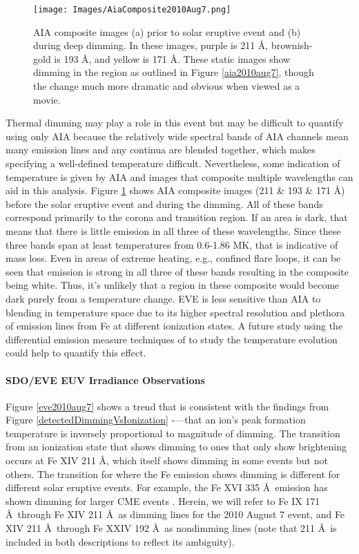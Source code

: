 \begin{figure}[!h]
    \begin{center}
	    \texttt{[image: Images/AiaComposite2010Aug7.png]}
    \end{center}
    \caption[AIA before/after images of 2010 August 7 event]{
	    AIA composite images (a) prior to solar eruptive event and (b) during deep dimming. In these images, purple is 
	    211 \AA, brownish-gold is 193 \AA, and yellow is 171 \AA. These static images show dimming in the region as outlined 
	    in Figure \ref{aia2010aug7}, though the change much more dramatic and obvious when viewed as a movie. 
	}
    \label{aiacomposite2010aug7}
\end{figure}

Thermal dimming may play a role in this event but may be difficult to quantify using only AIA because the relatively wide spectral bands of AIA channels mean many emission lines and any continua are blended together, which makes specifying a well-defined temperature difficult. Nevertheless, some indication of temperature is given by AIA and images that composite multiple wavelengths can aid in this analysis. Figure \ref{aiacomposite2010aug7} shows AIA composite images (211 \& 193 \& 171 \AA) before the solar eruptive event and during the dimming. All of these bands correspond primarily to the corona and transition region. If an area is dark, that means that there is little emission in all three of these wavelengths. Since these three bands span at least temperatures from 0.6-1.86 MK, that is indicative of mass loss. Even in areas of extreme heating, e.g., confined flare loops, it can be seen that emission is strong in all three of these bands resulting in the composite being white. Thus, it's unlikely that a region in these composite would become dark purely from a temperature change. EVE is less sensitive than AIA to blending in temperature space due to its higher spectral resolution and plethora of emission lines from Fe at different ionization states. A future study using the differential emission measure techniques of \citet{Caspi2014} to study the temperature evolution could help to quantify this effect.

\paragraph{SDO/EVE EUV Irradiance Observations}
Figure \ref{eve2010aug7} shows a trend that is consistent with the findings from Figure \ref{detectedDimmingVsIonization} -—that an ion’s peak formation temperature is inversely proportional to magnitude of dimming. The transition from an ionization state that shows dimming to ones that only show brightening occurs at Fe XIV 211 \AA, which itself shows dimming in some events but not others. The transition for where the Fe emission shows dimming is different for different solar eruptive events. For example, the Fe XVI 335 \AA\ emission has shown dimming for larger CME events \citep{Woods2011}. Herein, we will refer to Fe IX 171 \AA\ through Fe XIV 211 \AA\ as dimming lines for the 2010 August 7 event, and Fe XIV 211 \AA\ through Fe XXIV 192 \AA\ as nondimming lines (note that 211 \AA\ is included in both descriptions to reflect its ambiguity).

